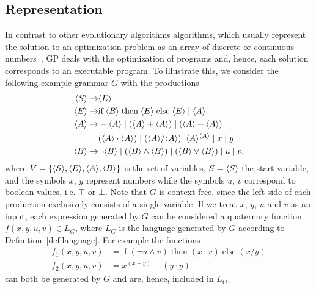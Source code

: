 \subsection{Representation}
In contrast to other evolutionary algorithms algorithms, which usually represent the solution to an optimization problem as an array of discrete or continuous numbers~\cite{back1997handbook}, GP deals with the optimization of programs and, hence, each solution corresponds to an executable program.
To illustrate this, we consider the following example grammar $G$ with the productions
\begin{equation}
	\begin{split}
		\langle S \rangle \to & \langle E \rangle \\
		\langle E \rangle \to & \text{if} \; \langle B \rangle \; \text{then} \; \langle E \rangle \; \text{else} \; \langle E \rangle \; | \; \langle A \rangle \\
		\langle A \rangle \to & -\langle A \rangle \; | \; (\langle A \rangle + \langle A \rangle) \; | \; (\langle A \rangle - \langle A \rangle) \; | \\
		 & (\langle A \rangle \cdot \langle A \rangle) \; | \; (\langle A \rangle / \langle A \rangle) \; | \langle A \rangle^{\langle A \rangle} \; | \; x \; | \; y \\  
		\langle B \rangle \to & \neg \langle B \rangle \; | \; (\langle B \rangle \wedge \langle B \rangle) \; | \; (\langle B \rangle \vee \langle B \rangle) \; | \; u \; | \; v,
	\end{split}
\label{eq:gp-example-grammar}
\end{equation}
where $V = \{\langle S \rangle, \langle E \rangle, \langle A \rangle, \langle B \rangle\}$ is the set of variables, $S = \langle S \rangle$ the start variable, and the symbols $x$, $y$ represent numbers while the symbols $u$, $v$ correspond to boolean values, i.e. $\top$ or $\bot$.
Note that $G$ is context-free, since the left side of each production exclusively consists of a single variable.
If we treat $x$, $y$, $u$ and $v$ as an input, each expression generated by $G$ can be considered a quaternary function $f(x,y,u,v) \in L_{G}$, where $L_G$ is the language generated by $G$ according to Definition~\ref{def:language}.
For example the functions
\begin{equation}
	\begin{split}
		f_1(x,y,u,v) & = \text{if} \; (\neg u \wedge v) \; \text{then} \; (x \cdot x) \; \text{else} \; (x / y) \\
		f_2(x,y,u,v) & = x^{(x + y)} - (y \cdot y)
	\end{split}
\label{eq:gp-example-functions}
\end{equation} can both be generated by $G$ and are, hence, included in $L_G$.

